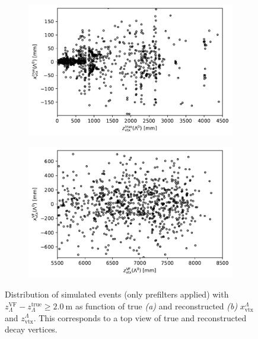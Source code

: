 \begin{figure}[t]
	\centering
	\begin{subfigure}{.45\textwidth}
		\includegraphics[width=\textwidth]{graphics/03-vertex_reconstruction/bump_Lambda_true_endvertex_z_vs_x.pdf}
		\caption{}
		\label{fig:3:bump_true}
	\end{subfigure}
	\begin{subfigure}{.45\textwidth}
		\includegraphics[width=\textwidth]{graphics/03-vertex_reconstruction/bump_scatter_Lambda_endvertex_z_vs_x.pdf}
		\caption{}
		\label{fig:3:bump_reco}
	\end{subfigure}
	\caption{Distribution of simulated \demonstratorshort events (only prefilters applied) with $z_\Lambda^\text{VF} - z_\Lambda^\text{true} \geq \SI{2.0}{\meter}$ as function of true \textit{(a)} and reconstructed \textit{(b)} $x^\Lambda_\text{vtx}$ and $z_\text{vtx}^\Lambda$. This corresponds to a top view of true and reconstructed \lz decay vertices.}
	\label{fig:3:bump}
\end{figure}

